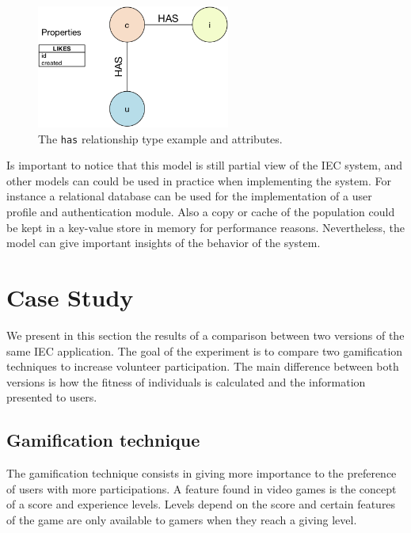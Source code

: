\documentclass[conference]{IEEEtran}
\begin{document}
  
\begin{figure}[!t]
    \centering
        \includegraphics[width=2.5in]{img/edge_properties_has.png}
    \caption{ The {\tt has} relationship type example and attributes.}
    \label{fig:has}
\end{figure}

Is important to notice that this model is still partial view of the IEC system,
and other models can could be used in practice when implementing the system. 
For instance a relational database can be used for the implementation of a
user profile and authentication module. Also a copy or cache of the population 
could be kept in a key-value store in memory for performance reasons. 
Nevertheless, the model can give important insights of the behavior of the 
system.  

\section{Case Study}
\label{sec:experiments}

We present in this section the results of a comparison between two versions
of the same IEC application. The goal of the experiment is to compare two 
gamification techniques to increase volunteer participation. 
The main difference between both versions is how the fitness of individuals
is calculated and the information presented to users. 
\subsection{Gamification technique}
\label{sec:gamification}
The gamification technique
consists in giving more importance to the preference of users with more
participations. A feature found in video games is the concept of a 
score and experience levels. Levels depend on the score and certain features
of the game are only available to gamers when they reach a giving level.  
\end{document}

